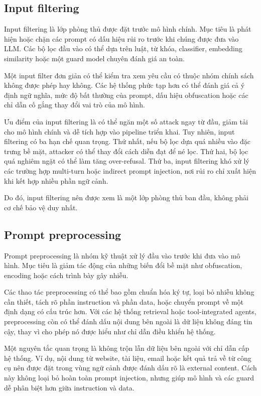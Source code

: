 \subsection{Input filtering}
\label{subsec:input-filtering}

Input filtering là lớp phòng thủ được đặt trước mô hình chính. Mục tiêu
là phát hiện hoặc chặn các prompt có dấu hiệu rủi ro trước khi chúng được
đưa vào LLM. Các bộ lọc đầu vào có thể dựa trên luật, từ khóa, classifier,
embedding similarity hoặc một guard model chuyên đánh giá an toàn.

Một input filter đơn giản có thể kiểm tra xem yêu cầu có thuộc nhóm chính
sách không được phép hay không. Các hệ thống phức tạp hơn có thể đánh giá
cả ý định ngữ nghĩa, mức độ bất thường của prompt, dấu hiệu obfuscation
hoặc các chỉ dẫn cố gắng thay đổi vai trò của mô hình.

Ưu điểm của input filtering là có thể ngăn một số attack ngay từ đầu, giảm
tải cho mô hình chính và dễ tích hợp vào pipeline triển khai. Tuy nhiên,
input filtering có ba hạn chế quan trọng. Thứ nhất, nếu bộ lọc dựa quá
nhiều vào đặc trưng bề mặt, attacker có thể thay đổi cách diễn đạt để né
lọc. Thứ hai, bộ lọc quá nghiêm ngặt có thể làm tăng over-refusal. Thứ ba,
input filtering khó xử lý các trường hợp multi-turn hoặc indirect prompt
injection, nơi rủi ro chỉ xuất hiện khi kết hợp nhiều phần ngữ cảnh.

Do đó, input filtering nên được xem là một lớp phòng thủ ban đầu, không
phải cơ chế bảo vệ duy nhất.

\subsection{Prompt preprocessing}
\label{subsec:prompt-preprocessing}

Prompt preprocessing là nhóm kỹ thuật xử lý đầu vào trước khi đưa vào mô
hình. Mục tiêu là giảm tác động của những biến đổi bề mặt như obfuscation,
encoding hoặc cách trình bày gây nhiễu.

Các thao tác preprocessing có thể bao gồm chuẩn hóa ký tự, loại bỏ nhiễu
không cần thiết, tách rõ phần instruction và phần data, hoặc chuyển prompt
về một định dạng có cấu trúc hơn. Với các hệ thống retrieval hoặc
tool-integrated agents, preprocessing còn có thể đánh dấu nội dung bên
ngoài là dữ liệu không đáng tin cậy, thay vì cho phép nó được hiểu như chỉ
dẫn điều khiển hệ thống.

Một nguyên tắc quan trọng là không trộn lẫn dữ liệu bên ngoài với chỉ dẫn
cấp hệ thống. Ví dụ, nội dung từ website, tài liệu, email hoặc kết quả trả
về từ công cụ nên được đặt trong vùng ngữ cảnh được đánh dấu rõ là
external content. Cách này không loại bỏ hoàn toàn prompt injection, nhưng
giúp mô hình và các guard dễ phân biệt hơn giữa instruction và data.

